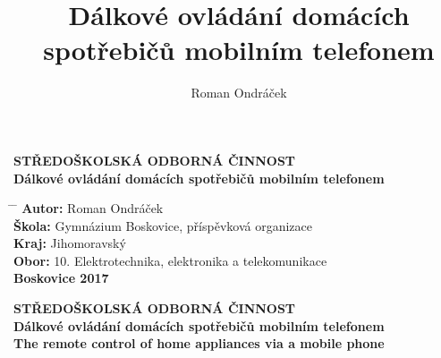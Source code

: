 \documentclass[12pt,a4paper,oneside]{article}
\author{Roman Ondráček}
\title{Dálkové ovládání domácích spotřebičů mobilním telefonem}
\begin{document}
\renewcommand{\baselinestretch}{1.5}
\pagestyle{empty}
\enlargethispage{60mm}
\begin{center}
\large \textbf{STŘEDOŠKOLSKÁ ODBORNÁ ČINNOST} \\

\vspace{32mm}
\huge \textbf{Dálkové ovládání domácích spotřebičů mobilním telefonem} \\

\vspace{64mm}
\end{center}

\begin{tabbing}
\hspace{4mm} \= \hspace{24mm} \= \kill
\> \large \textbf{Autor:}  \> \large{Roman Ondráček}                                    \\[4mm]
\> \large \textbf{Škola:}  \> \large{Gymnázium Boskovice, příspěvková organizace}       \\[4mm]
\> \large \textbf{Kraj:}   \> \large{Jihomoravský}                                      \\[4mm]
\> \large \textbf{Obor:}   \> \large{10. Elektrotechnika, elektronika a telekomunikace} \\[24mm]
\> \large \textbf{Boskovice 2017}
\end{tabbing}

\newpage
\pagestyle{empty}
\enlargethispage{60mm}
\begin{center}
\large \textbf{STŘEDOŠKOLSKÁ ODBORNÁ ČINNOST} \\

\vspace{32mm}
\huge \textbf{Dálkové ovládání domácích spotřebičů mobilním telefonem} \\
\vspace{16mm}
\huge \textbf{The remote control of home appliances via a mobile phone} \\

\vspace{24mm}
\end{center}
\end{document}
